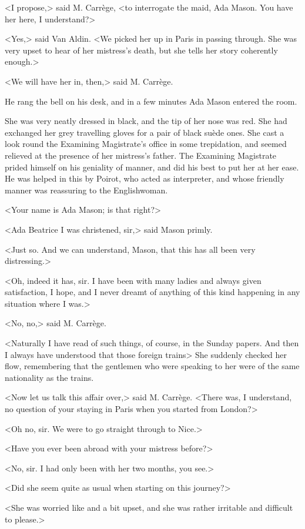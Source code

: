<I propose,> said M. Carrège, <to interrogate the maid, Ada Mason. You have her here, I understand?>

<Yes,> said Van Aldin. <We picked her up in Paris in passing through. She was very upset to hear of her mistress's death, but she tells her story coherently enough.>

<We will have her in, then,> said M. Carrège.

He rang the bell on his desk, and in a few minutes Ada Mason entered the room.

She was very neatly dressed in black, and the tip of her nose was red. She had exchanged her grey travelling gloves for a pair of black suède ones. She cast a look round the Examining Magistrate's office in some trepidation, and seemed relieved at the presence of her mistress's father. The Examining Magistrate prided himself on his geniality of manner, and did his best to put her at her ease. He was helped in this by Poirot, who acted as interpreter, and whose friendly manner was reassuring to the Englishwoman.

<Your name is Ada Mason; is that right?>

<Ada Beatrice I was christened, sir,> said Mason primly.

<Just so. And we can understand, Mason, that this has all been very distressing.>

<Oh, indeed it has, sir. I have been with many ladies and always given satisfaction, I hope, and I never dreamt of anything of this kind happening in any situation where I was.>

<No, no,> said M. Carrège.

<Naturally I have read of such things, of course, in the Sunday papers. And then I always have understood that those foreign trains\longdash> She suddenly checked her flow, remembering that the gentlemen who were speaking to her were of the same nationality as the trains.

<Now let us talk this affair over,> said M. Carrège. <There was, I understand, no question of your staying in Paris when you started from London?>

<Oh no, sir. We were to go straight through to Nice.>

<Have you ever been abroad with your mistress before?>

<No, sir. I had only been with her two months, you see.>

<Did she seem quite as usual when starting on this journey?>

<She was worried like and a bit upset, and she was rather irritable and difficult to please.>

